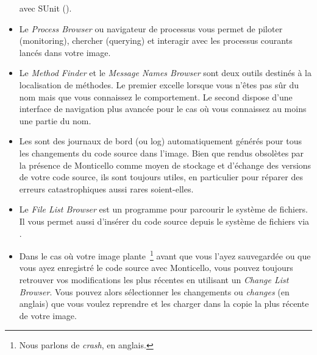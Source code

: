 \documentclass[a4paper,10pt,twoside]{book}
\begin{document}
\begin{itemize}
avec 
SUnit ().
  \item Le \emph{Process Browser} ou navigateur de processus vous permet de piloter (monitoring), chercher (querying) et interagir avec les processus courants lancés dans votre image.
  \item Le \emph{Method Finder} et le \emph{Message Names Browser} sont 
deux outils destinés à la localisation de méthodes. Le
premier excelle lorsque vous n'êtes pas sûr du nom mais que vous
connaissez le comportement.
Le second dispose d'une interface de navigation plus avancée pour le cas où
vous connaissez au moins une partie du nom.
  \item Les \changesets sont des journaux de bord (ou log) automatiquement générés pour 
tous les changements du code source dans l'image.
Bien que rendus obsolètes par la présence de Monticello comme
moyen de stockage et d'échange des versions de votre code source,
ils sont toujours utiles, en particulier pour réparer des erreurs
catastrophiques aussi rares soient-elles.
  \item Le \emph{File List Browser} est un programme pour parcourir le
système de fichiers. Il vous permet aussi d'insérer du code
source depuis le système de fichiers via .
  \item Dans le cas où votre image plante~\footnote{Nous parlons de \emph{crash}, en anglais.} avant que
vous l'ayez sauvegardée ou que vous ayez enregistré le code source
avec Monticello, vous pouvez toujours retrouver vos modifications les
plus récentes en utilisant un \emph{Change List Browser}. 
Vous pouvez alors sélectionner les changements ou \emph{changes} (en anglais) que vous voulez 
reprendre et les charger dans la copie la plus récente de votre image.
\end{itemize}

\ifx\wholebook\relax\else
\end{document}
